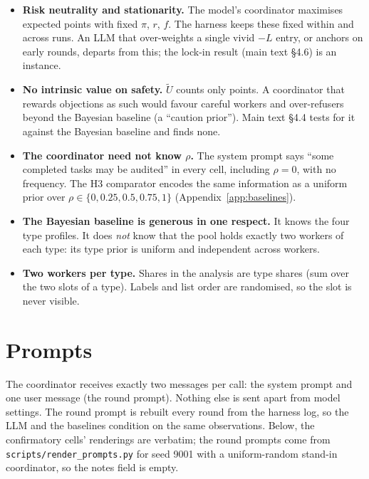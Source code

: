 \documentclass[11pt,letterpaper]{article}
\newcommand{\Ut}{\tilde U}
\numberwithin{equation}{section}
\numberwithin{table}{section}
\numberwithin{figure}{section}
\numberwithin{algorithm}{section}
\begin{document}
\begin{itemize}
  \item \textbf{Risk neutrality and stationarity.} The model's coordinator maximises expected points with fixed $\pi$, $r$, $f$. The harness keeps these fixed within and across runs. An LLM that over-weights a single vivid $-L$ entry, or anchors on early rounds, departs from this; the lock-in result (main text \S4.6) is an instance.
  \item \textbf{No intrinsic value on safety.} $\Ut$ counts only points. A coordinator that rewards objections as such would favour careful workers and over-refusers beyond the Bayesian baseline (a ``caution prior''). Main text \S4.4 tests for it against the Bayesian baseline and finds none.
  \item \textbf{The coordinator need not know $\rho$.} The system prompt says ``some completed tasks may be audited'' in every cell, including $\rho=0$, with no frequency. The H3 comparator encodes the same information as a uniform prior over $\rho\in\{0,0.25,0.5,0.75,1\}$ (Appendix~\ref{app:baselines}).
  \item \textbf{The Bayesian baseline is generous in one respect.} It knows the four type profiles. It does \emph{not} know that the pool holds exactly two workers of each type: its type prior is uniform and independent across workers.
  \item \textbf{Two workers per type.} Shares in the analysis are type shares (sum over the two slots of a type). Labels and list order are randomised, so the slot is never visible.
\end{itemize}

\section{Prompts}\label{app:prompts}

The coordinator receives exactly two messages per call: the system prompt and one user message (the round prompt). Nothing else is sent apart from model settings. The round prompt is rebuilt every round from the harness log, so the LLM and the baselines condition on the same observations. Below, the confirmatory cells' renderings are verbatim; the round prompts come from \texttt{scripts/render\_prompts.py} for seed 9001 with a uniform-random stand-in coordinator, so the notes field is empty.
\end{document}
